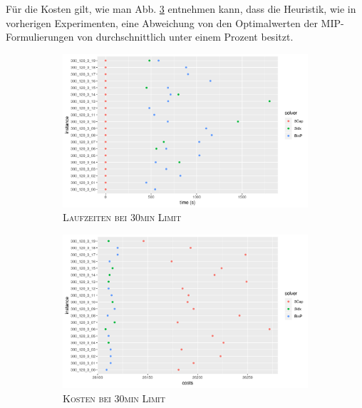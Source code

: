 Für die Kosten gilt, wie man Abb. \ref{fig:b=3_m_costs} entnehmen kann, dass die Heuristik, wie in vorherigen Experimenten,
eine Abweichung von den Optimalwerten der MIP-Formulierungen von durchschnittlich unter einem Prozent besitzt.

\begin{figure}[H]
\centering
\begin{subfigure}[b]{0.4\textwidth}
\centering
\includegraphics[width=1.3\textwidth]{img/solver_instance_time_b=3_m_1800s.png}
\caption{\textsc{Laufzeiten bei 30min Limit}}
\label{fig:b=3_m_runtimes}
\end{subfigure}
\hfill
\begin{subfigure}[b]{0.4\textwidth}
\centering
\includegraphics[width=1.3\textwidth]{img/solver_instance_cost_b=3_m_1800s.png}
\caption{\textsc{Kosten bei 30min Limit}}
\label{fig:b=3_m_costs}
\end{subfigure}
\caption{}
\end{figure}

